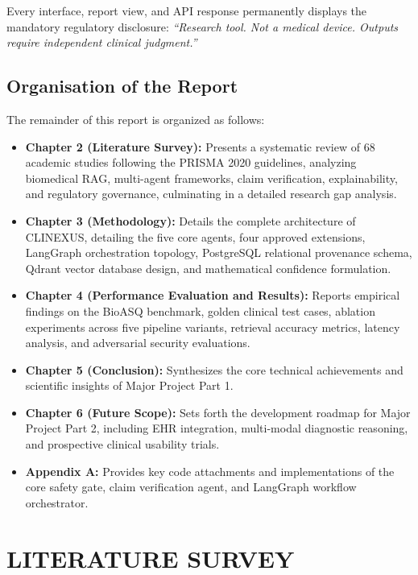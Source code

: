 \documentclass[12pt,a4paper]{report}
\begin{document}
Every interface, report view, and API response permanently displays the mandatory regulatory disclosure: \textit{``Research tool. Not a medical device. Outputs require independent clinical judgment.''}

\section{Organisation of the Report}
The remainder of this report is organized as follows:
\begin{itemize}
    \item \textbf{Chapter 2 (Literature Survey):} Presents a systematic review of 68 academic studies following the PRISMA 2020 guidelines, analyzing biomedical RAG, multi-agent frameworks, claim verification, explainability, and regulatory governance, culminating in a detailed research gap analysis.
    \item \textbf{Chapter 3 (Methodology):} Details the complete architecture of CLINEXUS, detailing the five core agents, four approved extensions, LangGraph orchestration topology, PostgreSQL relational provenance schema, Qdrant vector database design, and mathematical confidence formulation.
    \item \textbf{Chapter 4 (Performance Evaluation and Results):} Reports empirical findings on the BioASQ benchmark, golden clinical test cases, ablation experiments across five pipeline variants, retrieval accuracy metrics, latency analysis, and adversarial security evaluations.
    \item \textbf{Chapter 5 (Conclusion):} Synthesizes the core technical achievements and scientific insights of Major Project Part 1.
    \item \textbf{Chapter 6 (Future Scope):} Sets forth the development roadmap for Major Project Part 2, including EHR integration, multi-modal diagnostic reasoning, and prospective clinical usability trials.
    \item \textbf{Appendix A:} Provides key code attachments and implementations of the core safety gate, claim verification agent, and LangGraph workflow orchestrator.
\end{itemize}

\chapter{LITERATURE SURVEY}
\end{document}
